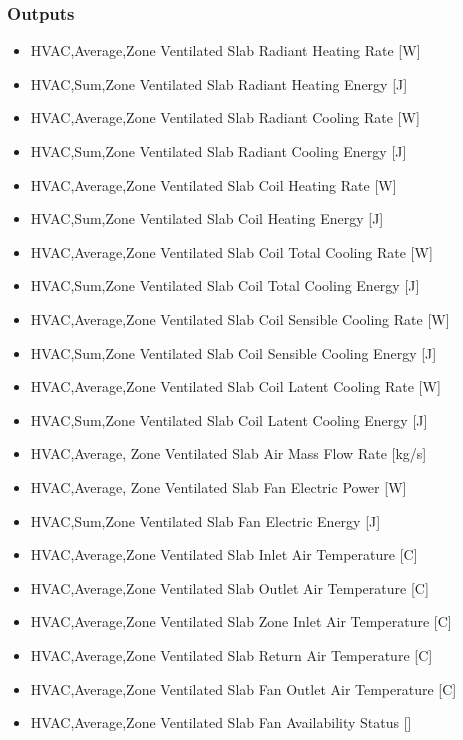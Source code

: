 \subsubsection{Outputs}\label{outputs-9-006}

\begin{itemize}
\item
  HVAC,Average,Zone Ventilated Slab Radiant Heating Rate {[}W{]}
\item
  HVAC,Sum,Zone Ventilated Slab Radiant Heating Energy {[}J{]}
\item
  HVAC,Average,Zone Ventilated Slab Radiant Cooling Rate {[}W{]}
\item
  HVAC,Sum,Zone Ventilated Slab Radiant Cooling Energy {[}J{]}
\item
  HVAC,Average,Zone Ventilated Slab Coil Heating Rate {[}W{]}
\item
  HVAC,Sum,Zone Ventilated Slab Coil Heating Energy {[}J{]}
\item
  HVAC,Average,Zone Ventilated Slab Coil Total Cooling Rate {[}W{]}
\item
  HVAC,Sum,Zone Ventilated Slab Coil Total Cooling Energy {[}J{]}
\item
  HVAC,Average,Zone Ventilated Slab Coil Sensible Cooling Rate {[}W{]}
\item
  HVAC,Sum,Zone Ventilated Slab Coil Sensible Cooling Energy {[}J{]}
\item
  HVAC,Average,Zone Ventilated Slab Coil Latent Cooling Rate {[}W{]}
\item
  HVAC,Sum,Zone Ventilated Slab Coil Latent Cooling Energy {[}J{]}
\item
  HVAC,Average, Zone Ventilated Slab Air Mass Flow Rate {[}kg/s{]}
\item
  HVAC,Average, Zone Ventilated Slab Fan Electric Power {[}W{]}
\item
  HVAC,Sum,Zone Ventilated Slab Fan Electric Energy {[}J{]}
\item
  HVAC,Average,Zone Ventilated Slab Inlet Air Temperature {[}C{]}
\item
  HVAC,Average,Zone Ventilated Slab Outlet Air Temperature {[}C{]}
\item
  HVAC,Average,Zone Ventilated Slab Zone Inlet Air Temperature {[}C{]}
\item
  HVAC,Average,Zone Ventilated Slab Return Air Temperature {[}C{]}
\item
  HVAC,Average,Zone Ventilated Slab Fan Outlet Air Temperature {[}C{]}
\item
  HVAC,Average,Zone Ventilated Slab Fan Availability Status {[]}
\end{itemize}

